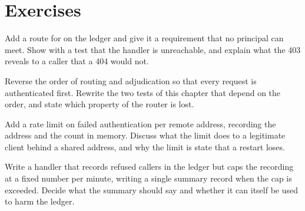 \section*{Exercises}

\begin{exercise}
Add a route for  on the ledger and give it a requirement that no principal can meet. Show with a test that the handler is unreachable, and explain what the 403 reveals to a caller that a 404 would not.
\end{exercise}

\begin{exercise}
Reverse the order of routing and adjudication so that every request is authenticated first. Rewrite the two tests of this chapter that depend on the order, and state which property of the router is lost.
\end{exercise}

\begin{exercise}
Add a rate limit on failed authentication per remote address, recording the address and the count in memory. Discuss what the limit does to a legitimate client behind a shared address, and why the limit is state that a restart loses.
\end{exercise}

\begin{exercise}
Write a handler that records refused callers in the ledger but caps the recording at a fixed number per minute, writing a single summary record when the cap is exceeded. Decide what the summary should say and whether it can itself be used to harm the ledger.
\end{exercise}
